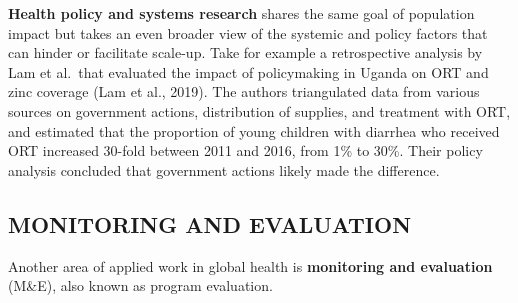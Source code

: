 \documentclass[
  letterpaper,
  DIV=11,
  numbers=noendperiod,
  oneside]{scrreprt}
\begin{document}
\textbf{Health policy and systems research} shares the same goal of
population impact but takes an even broader view of the systemic and
policy factors that can hinder or facilitate scale-up. Take for example
a retrospective analysis by Lam et al.~that evaluated the impact of
policymaking in Uganda on ORT and zinc coverage (Lam et al.,
2019).
The authors triangulated data from various sources on government
actions, distribution of supplies, and treatment with ORT, and estimated
that the proportion of young children with diarrhea who received ORT
increased 30-fold between 2011 and 2016, from 1\% to 30\%. Their policy
analysis concluded that government actions likely made the difference.

\hypertarget{monitoring-and-evaluation}{%
\subsection*{MONITORING AND
EVALUATION}\label{monitoring-and-evaluation}}

Another area of applied work in global health is \textbf{monitoring and
evaluation} (M\&E), also known as program evaluation.

\end{document}
